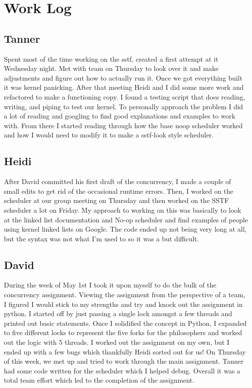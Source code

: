 \documentclass{article}
\begin{document}
\section*{Work Log}
\subsection*{Tanner}
Spent most of the time working on the sstf, created a first attempt at it Wednesday night. Met with team on Thursday to look over it and make adjustments and figure out how to actually run it. Once we got everything built it was kernel panicking. After that meeting Heidi and I did some more work and refactored to make a functioning copy. I found a testing script that does reading, writing, and piping to test our kernel. To personally approach the problem I did a lot of reading and googling to find good explanations and examples to work with. From there I started reading through how the base noop scheduler worked and how I would need to modify it to make a sstf-look style scheduler. 

\subsection*{Heidi}
After David committed his first draft of the concurrency, I made a couple of small edits to get rid of the occasional runtime errors. Then, I worked on the scheduler at our group meeting on Thursday and then worked on the SSTF scheduler a lot on Friday. My approach to working on this was basically to look at the linked list documentation and No-op scheduler and find examples of people using kernel linked lists on Google. The code ended up not being very long at all, but the syntax was not what I'm used to so it was a but difficult.

\subsection*{David}
During the week of May 1st I took it upon myself to do the bulk of the concurrency assignment. Viewing the assignment from the perspective of a team, I figured I would stick to my strengths and try and knock out the assignment in python. I started off by just passing a single lock amongst a few threads and printed out basic statements. Once I solidified the concept in Python, I expanded to five different locks to represent the five forks for the philosophers and worked out the logic with 5 threads. I worked out the assignment on my own, but I ended up with a few bugs which thankfully Heidi sorted out for us! On Thursday of this week, we met up and tried to work through the main assignment. Tanner had some code written for the scheduler which I helped debug. Overall it was a total team effort which led to the completion of the assignment.
\end{document}
